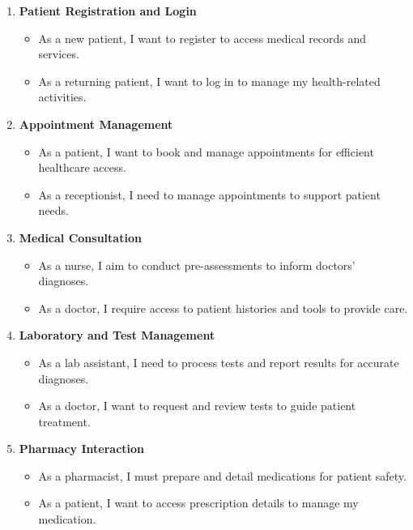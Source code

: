 \documentclass[12pt]{article} %
\begin{document}
    \begin{enumerate}
      \item {\small \textbf{Patient Registration and Login}}
      \begin{itemize}
        \item {\footnotesize As a new patient, I want to register to access medical records and services.}
        \item {\footnotesize As a returning patient, I want to log in to manage my health-related activities.}
      \end{itemize}
    
      \item {\small \textbf{Appointment Management}}
      \begin{itemize}
        \item {\footnotesize As a patient, I want to book and manage appointments for efficient healthcare access.}
        \item {\footnotesize As a receptionist, I need to manage appointments to support patient needs.}
      \end{itemize}
    
      \item {\small \textbf{Medical Consultation}}
      \begin{itemize}
        \item {\footnotesize As a nurse, I aim to conduct pre-assessments to inform doctors' diagnoses.}
        \item {\footnotesize As a doctor, I require access to patient histories and tools to provide care.}
      \end{itemize}
    
      \item {\small \textbf{Laboratory and Test Management}}
      \begin{itemize}
        \item {\footnotesize As a lab assistant, I need to process tests and report results for accurate diagnoses.}
        \item {\footnotesize As a doctor, I want to request and review tests to guide patient treatment.}
      \end{itemize}
    
      \item {\small \textbf{Pharmacy Interaction}}
      \begin{itemize}
        \item {\footnotesize As a pharmacist, I must prepare and detail medications for patient safety.}
        \item {\footnotesize As a patient, I want to access prescription details to manage my medication.}
      \end{itemize}
    

\end{enumerate}
\end{document}
